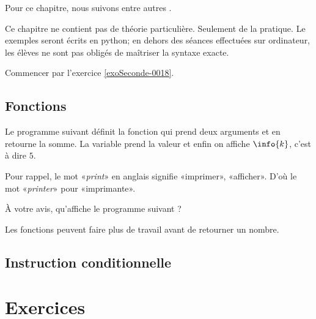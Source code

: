 
Pour ce chapitre, nous suivons entre autres \cite{oklaEg}.

Ce chapitre ne contient pas de théorie particulière. Seulement de la pratique. Le exemples seront écrits en python; en dehors des séances effectuées sur ordinateur, les élèves ne sont pas obligés de maîtriser la syntaxe exacte.

Commencer par l'exercice \ref{exoSeconde-0018}.

\subsection{Fonctions}

Le programme suivant définit la fonction  qui prend deux arguments et en retourne la somme. La variable  prend la valeur  et enfin on affiche \( \info{k}\), c'est à dire \( 5\).


Pour rappel, le mot «\emph{print}» en anglais signifie «imprimer», «afficher». D'où le mot «\emph{printer}» pour «imprimante».

À votre avis, qu'affiche le programme suivant ?


Les fonctions peuvent faire plus de travail avant de retourner un nombre.



\subsection{Instruction conditionnelle}

\section{Exercices}


